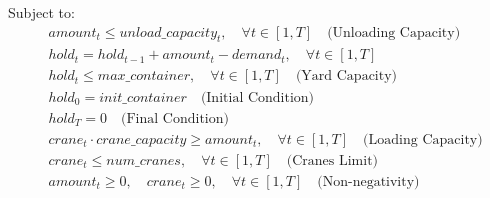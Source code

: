 \documentclass{article}
\begin{document}
Subject to:
\begin{align*}
    & amount_t \leq unload\_capacity_t, \quad \forall t \in [1, T] \quad \text{(Unloading Capacity)} \\
    & hold_t = hold_{t-1} + amount_t - demand_t, \quad \forall t \in [1, T] \\
    & hold_t \leq max\_container, \quad \forall t \in [1, T] \quad \text{(Yard Capacity)} \\
    & hold_0 = init\_container \quad \text{(Initial Condition)} \\
    & hold_T = 0 \quad \text{(Final Condition)} \\
    & crane_t \cdot crane\_capacity \geq amount_t, \quad \forall t \in [1, T] \quad \text{(Loading Capacity)} \\
    & crane_t \leq num\_cranes, \quad \forall t \in [1, T] \quad \text{(Cranes Limit)} \\
    & amount_t \geq 0, \quad crane_t \geq 0, \quad \forall t \in [1, T] \quad \text{(Non-negativity)}
\end{align*}
\end{document}
